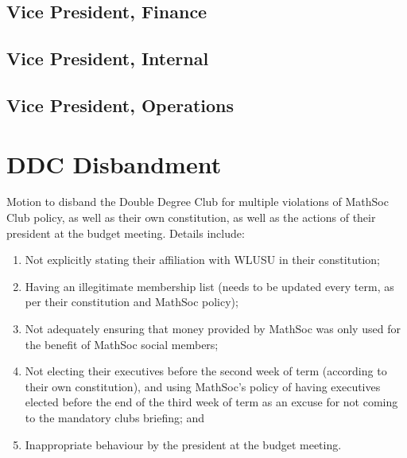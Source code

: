 \documentclass[12pt, letterpaper]{article}
\begin{document}
\subsection*{Vice President, Finance}


\subsection*{Vice President, Internal}


\subsection*{Vice President, Operations}


\newpage
{}
\section*{DDC Disbandment}
Motion to disband the Double Degree Club for multiple violations of MathSoc Club policy, as well as their own constitution, as well as the actions of their president at the budget meeting.
Details include:
\begin{enumerate}
	\item Not explicitly stating their affiliation with WLUSU in their constitution;
	\item Having an illegitimate membership list (needs to be updated every term, as per their constitution and MathSoc policy);
	\item Not adequately ensuring that money provided by MathSoc was only used for the benefit of MathSoc social members;
	\item Not electing their executives before the second week of term (according to their own constitution), and using MathSoc's policy of having executives elected before the end of the third week of term as an excuse for not coming to the mandatory clubs briefing; and
	\item Inappropriate behaviour by the president at the budget meeting.
\end{enumerate}

\newpage
{}


\newpage
{}




\newpage
{}
\end{document}
